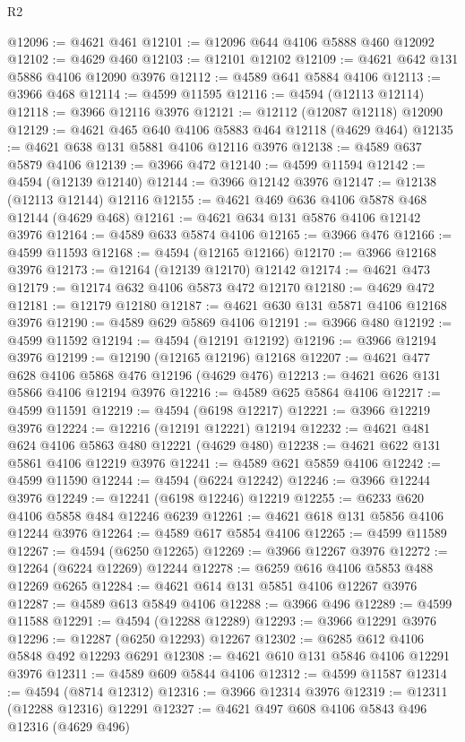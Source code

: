 \begin{lexlean}{R2}
\begin{coremodule}
@12096 := @4621 @461
@12101 := @12096 @644 @4106 @5888 @460 @12092
@12102 := @4629 @460
@12103 := @12101 @12102
@12109 := @4621 @642 @131 @5886 @4106 @12090 @3976
@12112 := @4589 @641 @5884 @4106
@12113 := @3966 @468
@12114 := @4599 @11595
@12116 := @4594 (@12113 @12114)
@12118 := @3966 @12116 @3976
@12121 := @12112 (@12087 @12118) @12090
@12129 := @4621 @465 @640 @4106 @5883 @464 @12118 (@4629 @464)
@12135 := @4621 @638 @131 @5881 @4106 @12116 @3976
@12138 := @4589 @637 @5879 @4106
@12139 := @3966 @472
@12140 := @4599 @11594
@12142 := @4594 (@12139 @12140)
@12144 := @3966 @12142 @3976
@12147 := @12138 (@12113 @12144) @12116
@12155 := @4621 @469 @636 @4106 @5878 @468 @12144 (@4629 @468)
@12161 := @4621 @634 @131 @5876 @4106 @12142 @3976
@12164 := @4589 @633 @5874 @4106
@12165 := @3966 @476
@12166 := @4599 @11593
@12168 := @4594 (@12165 @12166)
@12170 := @3966 @12168 @3976
@12173 := @12164 (@12139 @12170) @12142
@12174 := @4621 @473
@12179 := @12174 @632 @4106 @5873 @472 @12170
@12180 := @4629 @472
@12181 := @12179 @12180
@12187 := @4621 @630 @131 @5871 @4106 @12168 @3976
@12190 := @4589 @629 @5869 @4106
@12191 := @3966 @480
@12192 := @4599 @11592
@12194 := @4594 (@12191 @12192)
@12196 := @3966 @12194 @3976
@12199 := @12190 (@12165 @12196) @12168
@12207 := @4621 @477 @628 @4106 @5868 @476 @12196 (@4629 @476)
@12213 := @4621 @626 @131 @5866 @4106 @12194 @3976
@12216 := @4589 @625 @5864 @4106
@12217 := @4599 @11591
@12219 := @4594 (@6198 @12217)
@12221 := @3966 @12219 @3976
@12224 := @12216 (@12191 @12221) @12194
@12232 := @4621 @481 @624 @4106 @5863 @480 @12221 (@4629 @480)
@12238 := @4621 @622 @131 @5861 @4106 @12219 @3976
@12241 := @4589 @621 @5859 @4106
@12242 := @4599 @11590
@12244 := @4594 (@6224 @12242)
@12246 := @3966 @12244 @3976
@12249 := @12241 (@6198 @12246) @12219
@12255 := @6233 @620 @4106 @5858 @484 @12246 @6239
@12261 := @4621 @618 @131 @5856 @4106 @12244 @3976
@12264 := @4589 @617 @5854 @4106
@12265 := @4599 @11589
@12267 := @4594 (@6250 @12265)
@12269 := @3966 @12267 @3976
@12272 := @12264 (@6224 @12269) @12244
@12278 := @6259 @616 @4106 @5853 @488 @12269 @6265
@12284 := @4621 @614 @131 @5851 @4106 @12267 @3976
@12287 := @4589 @613 @5849 @4106
@12288 := @3966 @496
@12289 := @4599 @11588
@12291 := @4594 (@12288 @12289)
@12293 := @3966 @12291 @3976
@12296 := @12287 (@6250 @12293) @12267
@12302 := @6285 @612 @4106 @5848 @492 @12293 @6291
@12308 := @4621 @610 @131 @5846 @4106 @12291 @3976
@12311 := @4589 @609 @5844 @4106
@12312 := @4599 @11587
@12314 := @4594 (@8714 @12312)
@12316 := @3966 @12314 @3976
@12319 := @12311 (@12288 @12316) @12291
@12327 := @4621 @497 @608 @4106 @5843 @496 @12316 (@4629 @496)

\end{coremodule}
\end{lexlean}
